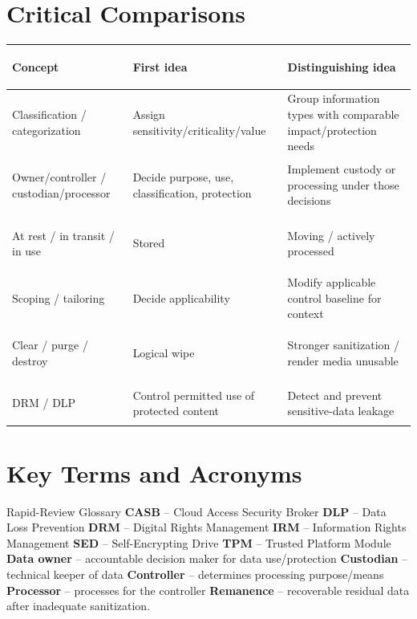 \documentclass[10pt,letterpaper]{article}
\begin{document}
\section{\color{navy}Critical Comparisons}
\begin{center}\small
\begin{tabularx}{\textwidth}{>{\bfseries\color{navy}\raggedright\arraybackslash}p{}>{\raggedright\arraybackslash}X>{\raggedright\arraybackslash}X}
\toprule Concept & First idea & Distinguishing idea\\\midrule
Classification / categorization & Assign sensitivity/criticality/value & Group information types with comparable impact/protection needs\\
Owner/controller / custodian/processor & Decide purpose, use, classification, protection & Implement custody or processing under those decisions\\
At rest / in transit / in use & Stored & Moving / actively processed\\
Scoping / tailoring & Decide applicability & Modify applicable control baseline for context\\
Clear / purge / destroy & Logical wipe & Stronger sanitization / render media unusable\\
DRM / DLP & Control permitted use of protected content & Detect and prevent sensitive-data leakage\\
\bottomrule
\end{tabularx}
\end{center}

\section{\color{navy}Key Terms and Acronyms}
\begin{summarybox}{Rapid-Review Glossary}
\textbf{CASB} -- Cloud Access Security Broker \quad
\textbf{DLP} -- Data Loss Prevention \quad
\textbf{DRM} -- Digital Rights Management \quad
\textbf{IRM} -- Information Rights Management \quad
\textbf{SED} -- Self-Encrypting Drive \quad
\textbf{TPM} -- Trusted Platform Module \quad
\textbf{Data owner} -- accountable decision maker for data use/protection \quad
\textbf{Custodian} -- technical keeper of data \quad
\textbf{Controller} -- determines processing purpose/means \quad
\textbf{Processor} -- processes for the controller \quad
\textbf{Remanence} -- recoverable residual data after inadequate sanitization.
\end{summarybox}
\end{document}
